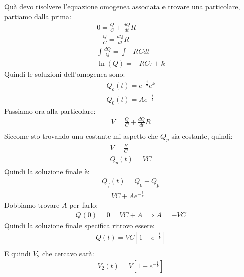 \documentclass[a4paper, oneside]{article}
\begin{document}
Quà devo risolvere l'equazione omogenea associata e trovare una particolare, partiamo dalla prima:
\begin{gather*}
    0 = \frac{Q}{C} + \frac{dQ}{dt} R\\
    -\frac{Q}{C} = \frac{dQ}{dt} R\\
    \int \frac{dQ}{Q} = \int - RC dt\\
    \ln(Q) = -RC \tau + k
\end{gather*}
Quindi le soluzioni dell'omogenea sono:
\begin{gather*}
    Q_o(t) = e^{-\frac{t}{\tau}} e^k\\
    Q_0(t) = A e^{-\frac{t}{\tau}}
\end{gather*}
Passiamo ora alla particolare:
\begin{gather*}
    V = \frac{Q}{C} + \frac{dQ}{dt} R\\
\end{gather*}
Siccome sto trovando una costante mi aspetto che $Q_p$ sia costante, quindi:
\begin{gather*}
    V = \frac{B}{C}\\
    Q_p(t) = VC
\end{gather*}
Quindi la soluzione finale è:
\begin{gather*}
    Q_f(t) = Q_o + Q_p \\
    = VC + A e^{-\frac{t}{\tau}}
\end{gather*}
Dobbiamo trovare $A$ per farlo:
\begin{gather*}
    Q(0) = 0 = VC + A \implies A = -VC
\end{gather*}
Quindi la soluzione finale specifica ritrovo essere:
\begin{gather*}
    Q(t) = VC \left[ 1 - e^{-\frac{t}{\tau}} \right]\\
\end{gather*}
E quindi $V_2$ che cercavo sarà:
\begin{gather*}
    V_2(t) = V \left[ 1 - e^{-\frac{t}{\tau}} \right]
\end{gather*}
\end{document}
